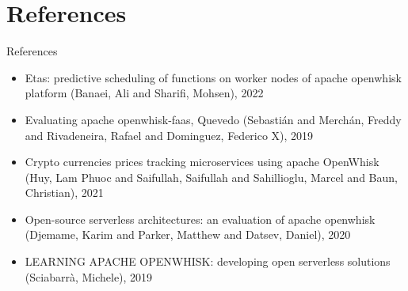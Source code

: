 \documentclass[aspectratio=169]{beamer}
\begin{document}
\section*{References}
\begin{frame}{References}
    \begin{itemize}
        \item Etas: predictive scheduling of functions on worker nodes of apache openwhisk platform (Banaei, Ali and Sharifi, Mohsen), 2022
        \item Evaluating apache openwhisk-faas, Quevedo (Sebasti{\'a}n and Merch{\'a}n, Freddy and Rivadeneira, Rafael and Dominguez, Federico X), 2019
        \item Crypto currencies prices tracking microservices using apache OpenWhisk (Huy, Lam Phuoc and Saifullah, Saifullah and Sahillioglu, Marcel and Baun, Christian), 2021 
        \item Open-source serverless architectures: an evaluation of apache openwhisk (Djemame, Karim and Parker, Matthew and Datsev, Daniel), 2020
        \item LEARNING APACHE OPENWHISK: developing open serverless solutions (Sciabarr{\`a}, Michele), 2019
    \end{itemize}
\end{frame}
\end{document}
